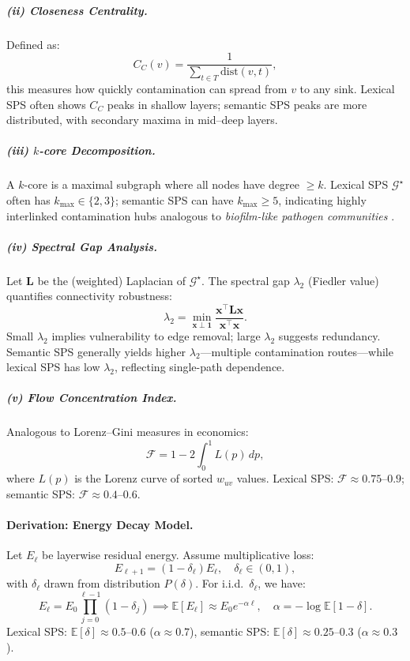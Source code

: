 \documentclass[11pt]{article}
\begin{document}
\subparagraph{(ii) Closeness Centrality.}
Defined as:
\[
C_C(v) = \frac{1}{\sum_{t \in T} \mathrm{dist}(v,t)},
\]
this measures how quickly contamination can spread from $v$ to any sink.  
Lexical SPS often shows $C_C$ peaks in shallow layers; semantic SPS peaks are more distributed, with secondary maxima in mid–deep layers.

\subparagraph{(iii) $k$-core Decomposition.}
A $k$-core is a maximal subgraph where all nodes have degree $\ge k$.  
Lexical SPS $\mathcal{G}^\star$ often has $k_{\max} \in \{2,3\}$; semantic SPS can have $k_{\max} \ge 5$, indicating highly interlinked contamination hubs analogous to \emph{biofilm-like pathogen communities} \citep{flemming2016biofilms}.

\subparagraph{(iv) Spectral Gap Analysis.}
Let $\mathbf{L}$ be the (weighted) Laplacian of $\mathcal{G}^\star$.  
The spectral gap $\lambda_2$ (Fiedler value) quantifies connectivity robustness:
\[
\lambda_2 = \min_{\mathbf{x} \perp \mathbf{1}} \frac{\mathbf{x}^\top \mathbf{L} \mathbf{x}}{\mathbf{x}^\top \mathbf{x}}.
\]
Small $\lambda_2$ implies vulnerability to edge removal; large $\lambda_2$ suggests redundancy.  
Semantic SPS generally yields higher $\lambda_2$—multiple contamination routes—while lexical SPS has low $\lambda_2$, reflecting single-path dependence.

\subparagraph{(v) Flow Concentration Index.}
Analogous to Lorenz–Gini measures in economics:
\[
\mathcal{F} = 1 - 2 \int_0^1 L(p) \, dp,
\]
where $L(p)$ is the Lorenz curve of sorted $w_{uv}$ values.  
Lexical SPS: $\mathcal{F} \approx 0.75$–$0.9$; semantic SPS: $\mathcal{F} \approx 0.4$–$0.6$.

\paragraph{Derivation: Energy Decay Model.}
Let $E_\ell$ be layerwise residual energy. Assume multiplicative loss:
\[
E_{\ell+1} = (1-\delta_\ell) E_\ell, \quad \delta_\ell \in (0,1),
\]
with $\delta_\ell$ drawn from distribution $P(\delta)$.  
For i.i.d.\ $\delta_\ell$, we have:
\[
E_\ell = E_0 \prod_{j=0}^{\ell-1} (1-\delta_j) \implies \mathbb{E}[E_\ell] \approx E_0 e^{-\alpha \ell}, \quad \alpha = -\log \mathbb{E}[1-\delta].
\]
Lexical SPS: $\mathbb{E}[\delta] \approx 0.5$–$0.6$ ($\alpha\approx 0.7$), semantic SPS: $\mathbb{E}[\delta] \approx 0.25$–$0.3$ ($\alpha\approx 0.3$).
\end{document}

